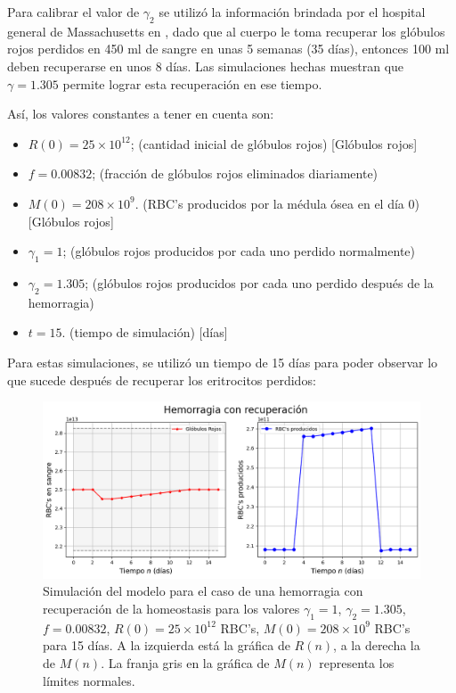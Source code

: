 Para calibrar el valor de $\gamma_2$ se utilizó la información brindada por el hospital general de Massachusetts en \cite{Massachusetts}, dado que al cuerpo le toma recuperar los glóbulos rojos perdidos en 450 ml de sangre en unas 5 semanas (35 días), entonces 100 ml deben recuperarse en unos 8 días. Las simulaciones hechas muestran que $\gamma=1.305$ permite lograr esta recuperación en ese tiempo.

Así, los valores constantes a tener en cuenta son:
\begin{itemize}
    \item $R(0) = 25\times 10^{12}$; (cantidad inicial de glóbulos rojos) [Glóbulos rojos]
    \item $f=0.00832$; (fracción de glóbulos rojos eliminados diariamente)
    \item $M(0) = 208 \times 10^{9}$. (RBC's producidos por la médula ósea en el día 0) [Glóbulos rojos]
    \item $\gamma_1=1$; (glóbulos rojos producidos por cada uno perdido normalmente)
    \item $\gamma_2=1.305$; (glóbulos rojos producidos por cada uno perdido después de la hemorragia)
    \item $t = 15$. (tiempo de simulación) [días]
\end{itemize}

Para estas simulaciones, se utilizó un tiempo de 15 días para poder observar lo que sucede después de recuperar los eritrocitos perdidos:

\begin{figure}[H]
    \centering
    \captionsetup{justification=centering}
    \includegraphics[scale=0.534]{figures/HemoLeveG13.png}
    \caption{Simulación del modelo para el caso de una hemorragia con recuperación de la homeostasis para los valores $\gamma_1 = 1$, $\gamma_2=1.305$, $f = 0.00832$, $R(0)=25\times 10^{12}$ RBC's, $M(0) = 208\times 10^{9}$ RBC's para 15 días. A la izquierda está la gráfica de $R(n)$, a la derecha la de $M(n)$. La franja gris en la gráfica de $M(n)$ representa los límites normales.}
    \label{sec:variaciones:fig:HemoLeveG13}
\end{figure}

